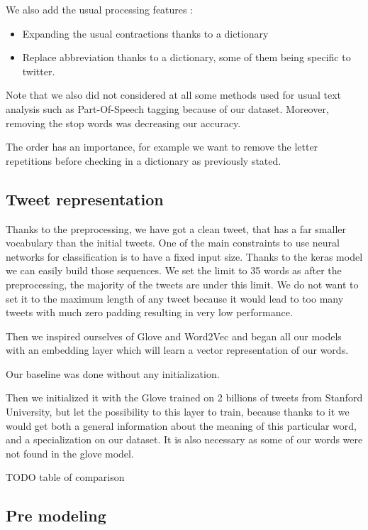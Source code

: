 \documentclass[10pt,conference,compsocconf]{IEEEtran}
\begin{document}
We also add the usual processing features : 
\begin{itemize}
    \item Expanding the usual contractions thanks to a dictionary
    \item Replace abbreviation thanks to a dictionary, some of them being specific to twitter.
\end{itemize}

Note that we also did not considered at all some methods used for usual text analysis such as Part-Of-Speech tagging because of our dataset. Moreover, removing the stop words was decreasing our accuracy.

The order has an importance, for example we want to remove the letter repetitions before checking in a dictionary as previously stated.

\subsection{Tweet representation}

Thanks to the preprocessing, we have got a clean tweet, that has a far smaller vocabulary than the initial tweets. One of the main constraints to use neural networks for classification is to have a fixed input size. Thanks to the keras model we can easily build those sequences. We set the limit to 35 words as after the preprocessing, the majority of the tweets are under this limit. We do not want to set it to the maximum length of any tweet because it would lead to too many tweets with much zero padding resulting in very low performance.

Then we inspired ourselves of Glove and Word2Vec and began all our models with an embedding layer which will learn a vector representation of our words.

Our baseline was done without any initialization.

Then we initialized it with the Glove trained on 2 billions of tweets from Stanford University, but let the possibility to this layer to train, because thanks to it we would get both a general information about the meaning of this particular word, and a specialization on our dataset. It is also necessary as some of our words were not found in the glove model.


TODO table of comparison


\subsection{Pre modeling}
\end{document}
